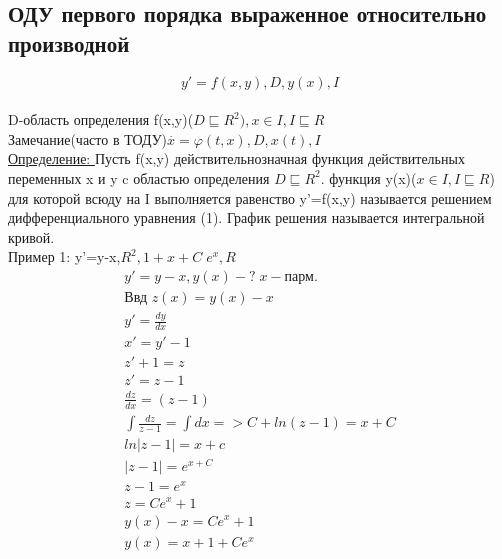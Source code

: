 \documentclass[12pt]{article}
\begin{document}
  \subsection*{ОДУ первого порядка выраженное относительно производной}
  \[y'=f(x,y),D,y(x),I\]\\
  D-область определения f(x,y)($D \sqsubseteq R^2),x \in I, I \sqsubseteq R$\\
  Замечание(часто в ТОДУ)$\overset{.}{x}=\varphi(t,x),D,x(t),I$\\
  \underline{Определение: } Пусть f(x,y) действительнозначная функция действительных переменных x и y
  c областью определения $D \sqsubseteq R^2$. функция y(x)($x \in I, I\sqsubseteq R$)
  для которой всюду на I выполняется равенство y'=f(x,y) называется решением дифференциального уравнения
  (1). График решения называется интегральной кривой.\\
  Пример 1: y'=y-x,$R^2,1+x+C \; e^x,R$\\
  \begin{gather*}
    y'=y-x,y(x)-? \; x-\text{парм.}\\
    \text{Ввд } z(x)=y(x)-x\\
    y'=\frac{dy}{dx}\\
    x'=y'-1\\
    z'+1=z\\
    z'=z-1\\
    \frac{dz}{dx}=(z-1)\\
    \int \frac{dz}{z-1}=\int dx => C+ln(z-1)=x+C\\
    ln|z-1|=x+c\\
    |z-1|=e^{x+C}\\
    z-1=e^x\\
    z=Ce^x+1\\
    y(x)-x=Ce^x+1\\
    y(x)=x+1+Ce^x
  \end{gather*}
\end{document}
